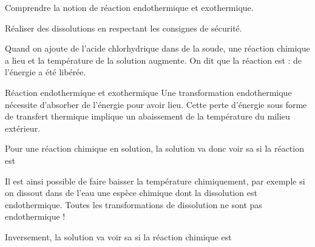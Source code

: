 \teteSndChim

\vspace*{-28pt}

\begin{objectifs}
  \item Comprendre la notion de réaction endothermique et exothermique.
  \item Réaliser des dissolutions en respectant les consignes de sécurité.
\end{objectifs}

\begin{contexte}
  Quand on ajoute de l'acide chlorhydrique dans de la soude, une réaction chimique a lieu et la température de la solution augmente.
  On dit que la réaction est  : de l'énergie a été libérée.
  
\end{contexte}
\bigskip


\begin{doc}{Réaction endothermique et exothermique}
  Une transformation endothermique nécessite d'absorber de l'énergie pour avoir lieu.
  Cette perte d'énergie sous forme de transfert thermique implique un abaissement de la température du milieu extérieur.
  
  \begin{encart}
    Pour une réaction chimique en solution, la solution va donc voir sa  si la réaction est 
  \end{encart}
  
  Il est ainsi possible de faire baisser la température chimiquement, par exemple si on dissout dans de l'eau une espèce chimique dont la dissolution est endothermique.
  \attention Toutes les transformations de dissolution ne sont pas endothermique !
  
  \begin{encart}
    Inversement, la solution va voir sa  si la réaction chimique est 
  \end{encart}
\end{doc}
\bigskip

